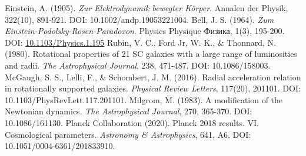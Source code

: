 \documentclass[12pt,a4paper]{article}
\begin{document}
\begin{thebibliography}{99}
		 Einstein, A. (1905). \textit{Zur Elektrodynamik bewegter Körper}. Annalen der Physik, 322(10), 891-921. DOI: 10.1002/andp.19053221004.
		 Bell, J. S. (1964). \textit{Zum Einstein-Podolsky-Rosen-Paradoxon}. Physics Physique {\selectfont Физика}, 1(3), 195-200. DOI: \href{https://doi.org/10.1103/Physics.1.195}{10.1103/Physics.1.195}
		 Rubin, V. C., Ford Jr, W. K., \& Thonnard, N. (1980). Rotational properties of 21 SC galaxies with a large range of luminosities and radii. \textit{The Astrophysical Journal}, 238, 471-487. DOI: 10.1086/158003.
		 McGaugh, S. S., Lelli, F., \& Schombert, J. M. (2016). Radial acceleration relation in rotationally supported galaxies. \textit{Physical Review Letters}, 117(20), 201101. DOI: 10.1103/PhysRevLett.117.201101.
		 Milgrom, M. (1983). A modification of the Newtonian dynamics. \textit{The Astrophysical Journal}, 270, 365-370. DOI: 10.1086/161130.
		 Planck Collaboration (2020). Planck 2018 results. VI. Cosmological parameters. \textit{Astronomy \& Astrophysics}, 641, A6. DOI: 10.1051/0004-6361/201833910.
	\end{thebibliography}
	
\end{document}
